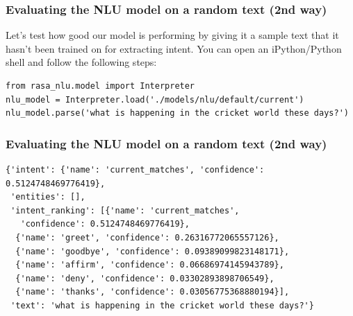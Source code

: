  \begin{frame}[fragile]\frametitle{Evaluating the NLU model on a random text (2nd way)}
 

Let's test how good our model is performing by giving it a sample text that it hasn't been trained on for extracting intent. You can open an iPython/Python shell and follow the following steps: 
\begin{lstlisting}
from rasa_nlu.model import Interpreter
nlu_model = Interpreter.load('./models/nlu/default/current')
nlu_model.parse('what is happening in the cricket world these days?')
\end{lstlisting}
 
\end{frame}

 \begin{frame}[fragile]\frametitle{Evaluating the NLU model on a random text (2nd way)}

\begin{lstlisting}
{'intent': {'name': 'current_matches', 'confidence': 0.5124748469776419},
 'entities': [],
 'intent_ranking': [{'name': 'current_matches',
   'confidence': 0.5124748469776419},
  {'name': 'greet', 'confidence': 0.26316772065557126},
  {'name': 'goodbye', 'confidence': 0.09389099823148171},
  {'name': 'affirm', 'confidence': 0.06686974145943789},
  {'name': 'deny', 'confidence': 0.03302893898706549},
  {'name': 'thanks', 'confidence': 0.03056775368880194}],
 'text': 'what is happening in the cricket world these days?'}
\end{lstlisting}

\end{frame}



